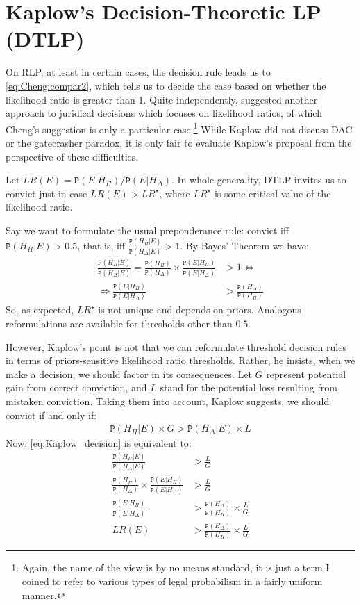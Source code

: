 \documentclass{ifcolog}
\newcommand{\pr}[1]{\mbox{$\mathtt{P}(#1)$}}
\begin{document}
 \section{Kaplow's Decision-Theoretic LP (DTLP)}\label{sec:DTLP}

 On RLP, at least in certain cases, the decision rule leads us to \eqref{eq:Cheng:compar2}, which tells us to decide the case based on whether the likelihood ratio is greater than 1. Quite independently, \citet{kaplow2014likelihood} suggested another approach to juridical decisions which focuses on likelihood ratios, of which Cheng's suggestion is only a particular case.\footnote{Again, the name of the view is by no means standard, it is  just a term I coined to refer to various types of legal probabilism in a fairly uniform manner.}  While Kaplow did not discuss DAC or the gatecrasher paradox, it is only fair to evaluate Kaplow's proposal from the perspective of these difficulties. 

 Let $LR(E)=\pr{E\vert H_\Pi}/\pr{E\vert H_\Delta}$. In whole generality, DTLP invites us to convict just in case $LR(E)>LR^\star$, where $LR^\star$ is some critical value of the likelihood ratio. 

 Say we want to formulate the usual preponderance rule: convict iff $\pr{H_\Pi\vert E}>0.5$, that is, iff $\frac{\pr{H_\Pi\vert E}}{\pr{H_\Delta\vert E}}>1$. By Bayes' Theorem we have:
 \begin{align*}
\frac{\pr{H_\Pi\vert E}}{\pr{H_\Delta\vert E}} =  \frac{\pr{H_\Pi}}{\pr{H_\Delta}}\times \frac{\pr{E\vert H_\Pi}}{\pr{E\vert H_\Delta}} &>1 \Leftrightarrow\\
  \Leftrightarrow \frac{\pr{E\vert H_\Pi}}{\pr{E\vert H_\Delta}} &> \frac{\pr{H_\Delta}}{\pr{H_\Pi}} 
 \end{align*}
 \noindent So, as expected, $LR^\star$ is not unique and depends on priors. Analogous reformulations are available for thresholds other than $0.5$. 

However, Kaplow's  point is not that we can reformulate threshold decision rules in terms of priors-sensitive likelihood ratio thresholds. Rather, he insists, when we make a decision, we should factor in its consequences. Let $G$ represent potential gain from correct conviction, and $L$ stand for the potential loss resulting from mistaken conviction. Taking them into account, Kaplow suggests, we should convict if and only if:
 \begin{align}
\label{eq:Kaplow_decision}
\pr{H_\Pi\vert E}\times G > \pr{H_\Delta\vert E}\times L
\end{align}
\noindent Now, \eqref{eq:Kaplow_decision} is equivalent to:
\begin{align}
\nonumber
\frac{\pr{H_\Pi \vert E}}{\pr{H_\Delta \vert E}} & > \frac{L}{G}\\
\nonumber
\frac{\pr{H_\Pi}}{\pr{H_\Delta}} \times \frac{\pr{E\vert H_\Pi}}{\pr{E\vert H_\Delta}} &> \frac{L}{G}\\
\nonumber
\frac{\pr{E\vert H_\Pi}}{\pr{E\vert H_\Delta}}  & > \frac{\pr{H_\Delta}}{\pr{H_\Pi}} \times \frac{L}{G}\\
\label{eq:Kaplow_decision2} LR(E)  & > \frac{\pr{H_\Delta}}{\pr{H_\Pi}} \times \frac{L}{G}
\end{align}
\end{document}
